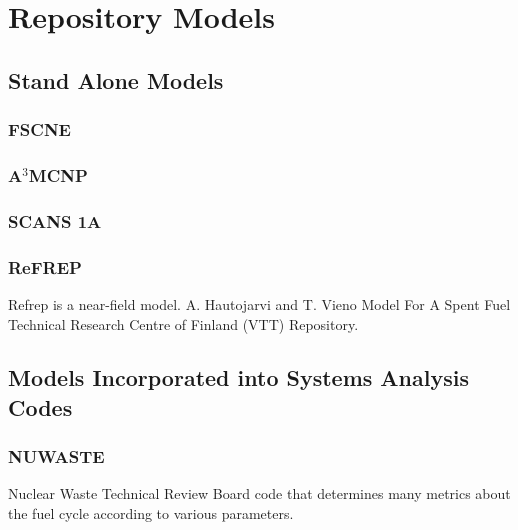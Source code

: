 

\section{Repository Models}
\subsection{Stand Alone Models}
\subsubsection{FSCNE}

\subsubsection{A$^3$MCNP}

\subsubsection{SCANS 1A}

\subsubsection{ReFREP}
Refrep is a near-field model.  A. Hautojarvi and T. Vieno Model For A Spent Fuel Technical Research 
Centre of Finland (VTT) Repository.\cite{miron_identification_2009}
\subsection{Models Incorporated into Systems Analysis Codes}
\subsubsection{NUWASTE} Nuclear Waste Technical Review Board code that determines many metrics about 
the fuel cycle according to various parameters. \cite{NuwastePres} 

